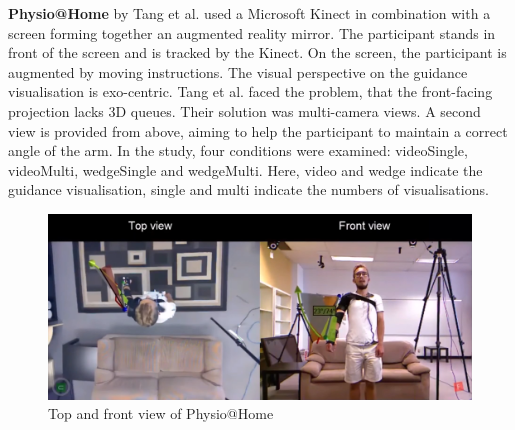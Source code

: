 \textbf{Physio@Home} by Tang et al. \cite{Tang2015} used a Microsoft Kinect in combination with a screen forming together an augmented reality mirror. The participant stands in front of the screen and is tracked by the Kinect. On the screen, the participant is augmented by moving instructions. The visual perspective on the guidance visualisation is exo-centric. Tang et al. faced the problem, that the front-facing projection lacks 3D queues. Their solution was multi-camera views. A second view is provided from above, aiming to help the participant to maintain a correct angle of the arm. In the study, four conditions were examined: videoSingle, videoMulti, wedgeSingle and wedgeMulti. Here, video and wedge indicate the guidance visualisation, single and multi indicate the numbers of visualisations.
\begin{figure}
	\centering
	\includegraphics[width=1.0\textwidth]{img/physioPersp.png}
	\caption{Top and front view of Physio@Home \cite{Tang2015}}
	\label{fig:physio_persp}
\end{figure}
